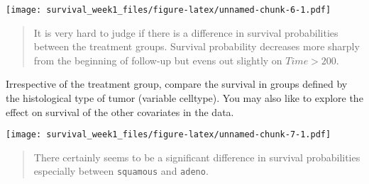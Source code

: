 \documentclass[]{article}
\newenvironment{Shaded}{\begin{snugshade}}{\end{snugshade}}
\newcommand{\KeywordTok}[1]{\textcolor[rgb]{0.13,0.29,0.53}{\textbf{#1}}}
\newcommand{\DataTypeTok}[1]{\textcolor[rgb]{0.13,0.29,0.53}{#1}}
\newcommand{\DecValTok}[1]{\textcolor[rgb]{0.00,0.00,0.81}{#1}}
\newcommand{\StringTok}[1]{\textcolor[rgb]{0.31,0.60,0.02}{#1}}
\newcommand{\OtherTok}[1]{\textcolor[rgb]{0.56,0.35,0.01}{#1}}
\newcommand{\OperatorTok}[1]{\textcolor[rgb]{0.81,0.36,0.00}{\textbf{#1}}}
\newcommand{\NormalTok}[1]{#1}
\begin{document}
\texttt{[image: survival\_week1\_files/figure-latex/unnamed-chunk-6-1.pdf]}

\begin{quote}
It is very hard to judge if there is a difference in survival
probabilities between the treatment groups. Survival probability
decreases more sharply from the beginning of follow-up but evens out
slightly on \(Time > 200\).
\end{quote}

Irrespective of the treatment group, compare the survival in groups
defined by the histological type of tumor (variable celltype). You may
also like to explore the effect on survival of the other covariates in
the data.

\begin{Shaded}
\end{Shaded}

\texttt{[image: survival\_week1\_files/figure-latex/unnamed-chunk-7-1.pdf]}

\begin{quote}
There certainly seems to be a significant difference in survival
probabilities especially between \texttt{squamous} and \texttt{adeno}.
\end{quote}
\end{document}

